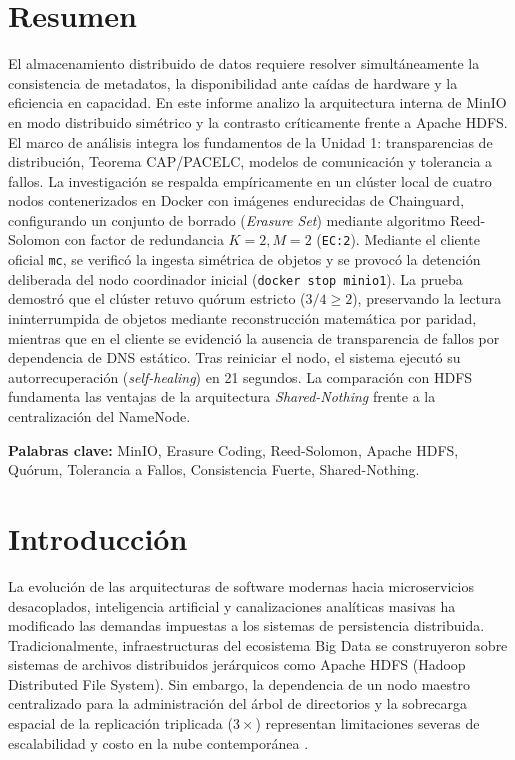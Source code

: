 \documentclass[12pt,a4paper]{article}
\begin{document}
\section*{Resumen}
El almacenamiento distribuido de datos requiere resolver simultáneamente la consistencia de metadatos, la disponibilidad ante caídas de hardware y la eficiencia en capacidad. En este informe analizo la arquitectura interna de MinIO en modo distribuido simétrico y la contrasto críticamente frente a Apache HDFS. El marco de análisis integra los fundamentos de la Unidad 1: transparencias de distribución, Teorema CAP/PACELC, modelos de comunicación y tolerancia a fallos. La investigación se respalda empíricamente en un clúster local de cuatro nodos contenerizados en Docker con imágenes endurecidas de Chainguard, configurando un conjunto de borrado (\emph{Erasure Set}) mediante algoritmo Reed-Solomon con factor de redundancia $K=2, M=2$ (\texttt{EC:2}). Mediante el cliente oficial \texttt{mc}, se verificó la ingesta simétrica de objetos y se provocó la detención deliberada del nodo coordinador inicial (\texttt{docker stop minio1}). La prueba demostró que el clúster retuvo quórum estricto ($3/4 \ge 2$), preservando la lectura ininterrumpida de objetos mediante reconstrucción matemática por paridad, mientras que en el cliente se evidenció la ausencia de transparencia de fallos por dependencia de DNS estático. Tras reiniciar el nodo, el sistema ejecutó su autorrecuperación (\emph{self-healing}) en 21 segundos. La comparación con HDFS fundamenta las ventajas de la arquitectura \emph{Shared-Nothing} frente a la centralización del NameNode.

\textbf{Palabras clave:} MinIO, Erasure Coding, Reed-Solomon, Apache HDFS, Quórum, Tolerancia a Fallos, Consistencia Fuerte, Shared-Nothing.

\section{Introducción}
La evolución de las arquitecturas de software modernas hacia microservicios desacoplados, inteligencia artificial y canalizaciones analíticas masivas ha modificado las demandas impuestas a los sistemas de persistencia distribuida. Tradicionalmente, infraestructuras del ecosistema Big Data se construyeron sobre sistemas de archivos distribuidos jerárquicos como Apache HDFS (Hadoop Distributed File System). Sin embargo, la dependencia de un nodo maestro centralizado para la administración del árbol de directorios y la sobrecarga espacial de la replicación triplicada ($3\times$) representan limitaciones severas de escalabilidad y costo en la nube contemporánea \cite{malhotra2025evaluating,shin2023cache}.
\end{document}
